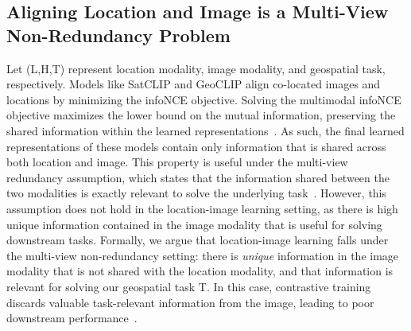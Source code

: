 \subsection{Aligning Location and Image is a Multi-View Non-Redundancy Problem}
\label{sec:multi-view}
Let (L,H,T) represent location modality, image modality, and geospatial task, respectively. Models like SatCLIP and GeoCLIP align co-located images and locations by minimizing the infoNCE objective. Solving the multimodal infoNCE objective maximizes the lower bound on the mutual information, preserving the shared information within the learned representations~\cite{oord2018representation}. As such, the final learned representations of these models contain only information that is shared across both location and image. This property is useful under the multi-view redundancy assumption, which states that the information shared between the two modalities is exactly relevant to solve the underlying task~\cite{tosh2021contrastive}. However, this assumption does not hold in the location-image learning setting, as there is high unique information contained in the image modality that is useful for solving downstream tasks. Formally, we argue that location-image learning falls under the multi-view non-redundancy setting: there is \textit{unique} information in the image modality that is not shared with the location modality, and that information is relevant for solving our geospatial task T. In this case, contrastive training discards valuable task-relevant information from the image, leading to poor downstream performance~\cite{liang2023factorized}.

